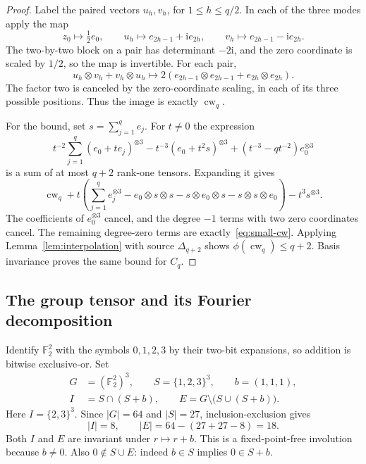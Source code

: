 \documentclass[10pt,a4paper]{article}
\theoremstyle{definition}
\theoremstyle{remark}
\numberwithin{equation}{section}
\newcommand{\F}{\mathbb F}
\begin{document}
\begin{proof}
Label the paired vectors $u_h,v_h$, for $1\leq h\leq q/2$.
In each of the three modes apply the map
\[
 z_0\longmapsto\tfrac12e_0,\qquad
 u_h\longmapsto e_{2h-1}+\mathrm i e_{2h},\qquad
 v_h\longmapsto e_{2h-1}-\mathrm i e_{2h}.
\]
The two-by-two block on a pair has determinant $-2\mathrm i$,
and the zero coordinate is scaled by $1/2$, so the map is invertible.
For each pair,
\[
 u_h\otimes v_h+v_h\otimes u_h
 \longmapsto
 2(e_{2h-1}\otimes e_{2h-1}+e_{2h}\otimes e_{2h}).
\]
The factor two is canceled by the zero-coordinate scaling, in each
of its three possible positions. Thus the image is exactly
$\operatorname{cw}_q$.

For the bound, set $s=\sum_{j=1}^q e_j$. For $t\ne0$ the expression
\begin{equation}\label{eq:cw-degeneration}
 t^{-2}\sum_{j=1}^q(e_0+te_j)^{\otimes3}
 -t^{-3}(e_0+t^2s)^{\otimes3}
 +(t^{-3}-qt^{-2})e_0^{\otimes3}
\end{equation}
is a sum of at most $q+2$ rank-one tensors. Expanding it gives
\begin{equation}\label{eq:cw-polynomial}
 \operatorname{cw}_q
 +t\left(\sum_{j=1}^q e_j^{\otimes3}
       -e_0\otimes s\otimes s-s\otimes e_0\otimes s
       -s\otimes s\otimes e_0\right)-t^3s^{\otimes3}.
\end{equation}
The coefficients of $e_0^{\otimes3}$ cancel, and the degree $-1$
terms with two zero coordinates cancel. The remaining degree-zero
terms are exactly~\eqref{eq:small-cw}. Applying
Lemma~\ref{lem:interpolation} with source $\Delta_{q+2}$ shows
$\phi(\operatorname{cw}_q)\leq q+2$. Basis invariance proves the
same bound for $C_q$.
\end{proof}

\subsection{The group tensor and its Fourier decomposition}

Identify $\F_2^2$ with the symbols $0,1,2,3$ by their two-bit
expansions, so addition is bitwise exclusive-or. Set
\begin{equation}\label{eq:sets}
 \begin{split}
 G&=(\F_2^2)^3,\qquad S=\{1,2,3\}^3,\qquad b=(1,1,1),\\
 I&=S\cap(S+b),\qquad E=G\setminus\bigl(S\cup(S+b)\bigr).
 \end{split}
\end{equation}
Here $I=\{2,3\}^3$. Since $|G|=64$ and $|S|=27$,
inclusion-exclusion gives
\begin{equation}\label{eq:set-sizes}
 |I|=8,\qquad |E|=64-(27+27-8)=18.
\end{equation}
Both $I$ and $E$ are invariant under $r\mapsto r+b$.
This is a fixed-point-free involution because $b\ne0$.
Also $0\notin S\cup E$: indeed $b\in S$ implies $0\in S+b$.
\end{document}
